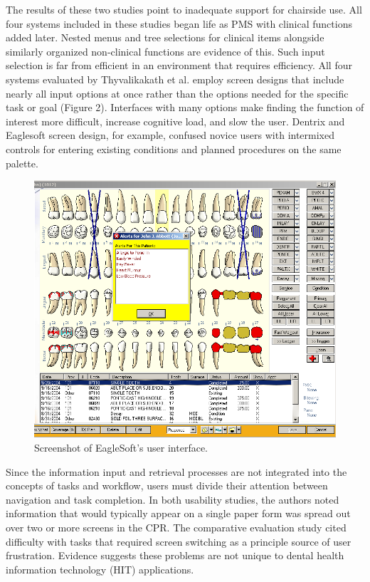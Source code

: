 \documentclass[11pt]{article}
\begin{document}
The results of these two studies point to inadequate support for chairside use. All four systems included in these studies began life as PMS with clinical functions added later. Nested menus and tree selections for clinical items alongside similarly organized non-clinical functions are evidence of this. Such input selection is far from efficient in an environment that requires efficiency. All four systems evaluated by Thyvalikakath et al. employ screen designs that include nearly all input options at once rather than the options needed for the specific task or goal (Figure 2). Interfaces with many options make finding the function of interest more difficult, increase cognitive load, and slow the user\cite{Qian2011Towards-develop}. Dentrix and Eaglesoft screen design, for example, confused novice users with intermixed controls for entering existing conditions and planned procedures on the same palette.
\label{fig:2}
\begin{figure}[h!tb]
\begin{center}
\includegraphics[width=\textwidth]{ss1es.png}
\end{center}
\caption{Screenshot of EagleSoft's user interface.}
\end{figure}Since the information input and retrieval processes are not integrated into the concepts of tasks and workflow, users must divide their attention between navigation and task completion. In both usability studies, the authors noted information that would typically appear on a single paper form was spread out over two or more screens in the CPR. The comparative evaluation study cited difficulty with tasks that required screen switching as a principle source of user frustration. Evidence suggests these problems are not unique to dental health information technology (HIT) applications\cite{Ash2004Some-unintended,Rose2005Using-qualitati}.
\end{document}
